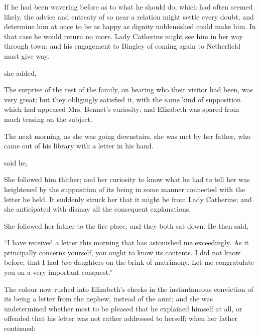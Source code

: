 If he had been wavering before as to what he should do, which had often seemed likely, the advice and entreaty of so near a relation might settle every doubt, and determine him at once to be as happy as dignity unblemished could make him. In that case he would return no more. Lady Catherine might see him in her way through town; and his engagement to Bingley of coming again to Netherfield must give way.

 she added, 

The surprise of the rest of the family, on hearing who their visitor had been, was very great; but they obligingly satisfied it, with the same kind of supposition which had appeased Mrs. Bennet's curiosity; and Elizabeth was spared from much teasing on the subject.

The next morning, as she was going downstairs, she was met by her father, who came out of his library with a letter in his hand.

 said he, 

She followed him thither; and her curiosity to know what he had to tell her was heightened by the supposition of its being in some manner connected with the letter he held. It suddenly struck her that it might be from Lady Catherine; and she anticipated with dismay all the consequent explanations.

She followed her father to the fire place, and they both sat down. He then said,

“I have received a letter this morning that has astonished me exceedingly. As it principally concerns yourself, you ought to know its contents. I did not know before, that I had {\em two} daughters on the brink of matrimony. Let me congratulate you on a very important conquest.”

The colour now rushed into Elizabeth's cheeks in the instantaneous conviction of its being a letter from the nephew, instead of the aunt; and she was undetermined whether most to be pleased that he explained himself at all, or offended that his letter was not rather addressed to herself; when her father continued:

